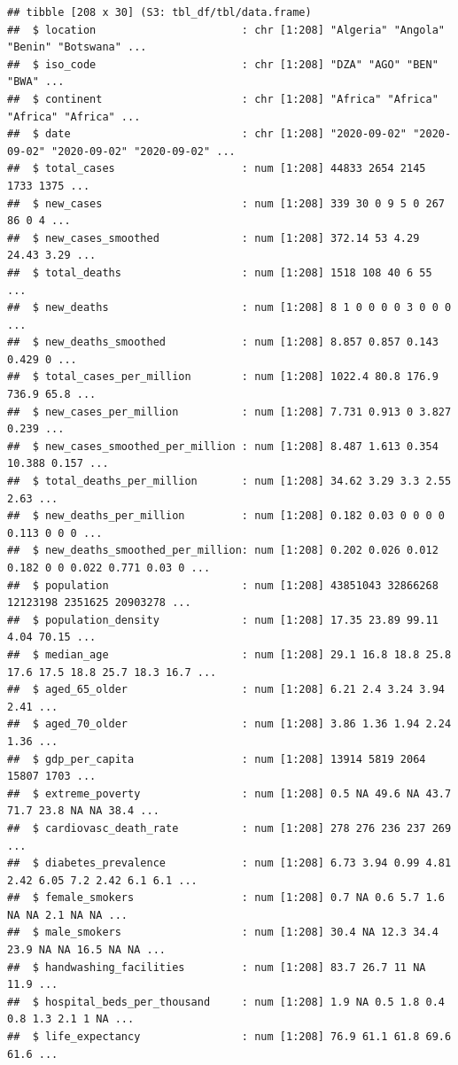 \documentclass[
]{article}
\begin{document}
\begin{verbatim}
## tibble [208 x 30] (S3: tbl_df/tbl/data.frame)
##  $ location                       : chr [1:208] "Algeria" "Angola" "Benin" "Botswana" ...
##  $ iso_code                       : chr [1:208] "DZA" "AGO" "BEN" "BWA" ...
##  $ continent                      : chr [1:208] "Africa" "Africa" "Africa" "Africa" ...
##  $ date                           : chr [1:208] "2020-09-02" "2020-09-02" "2020-09-02" "2020-09-02" ...
##  $ total_cases                    : num [1:208] 44833 2654 2145 1733 1375 ...
##  $ new_cases                      : num [1:208] 339 30 0 9 5 0 267 86 0 4 ...
##  $ new_cases_smoothed             : num [1:208] 372.14 53 4.29 24.43 3.29 ...
##  $ total_deaths                   : num [1:208] 1518 108 40 6 55 ...
##  $ new_deaths                     : num [1:208] 8 1 0 0 0 0 3 0 0 0 ...
##  $ new_deaths_smoothed            : num [1:208] 8.857 0.857 0.143 0.429 0 ...
##  $ total_cases_per_million        : num [1:208] 1022.4 80.8 176.9 736.9 65.8 ...
##  $ new_cases_per_million          : num [1:208] 7.731 0.913 0 3.827 0.239 ...
##  $ new_cases_smoothed_per_million : num [1:208] 8.487 1.613 0.354 10.388 0.157 ...
##  $ total_deaths_per_million       : num [1:208] 34.62 3.29 3.3 2.55 2.63 ...
##  $ new_deaths_per_million         : num [1:208] 0.182 0.03 0 0 0 0 0.113 0 0 0 ...
##  $ new_deaths_smoothed_per_million: num [1:208] 0.202 0.026 0.012 0.182 0 0 0.022 0.771 0.03 0 ...
##  $ population                     : num [1:208] 43851043 32866268 12123198 2351625 20903278 ...
##  $ population_density             : num [1:208] 17.35 23.89 99.11 4.04 70.15 ...
##  $ median_age                     : num [1:208] 29.1 16.8 18.8 25.8 17.6 17.5 18.8 25.7 18.3 16.7 ...
##  $ aged_65_older                  : num [1:208] 6.21 2.4 3.24 3.94 2.41 ...
##  $ aged_70_older                  : num [1:208] 3.86 1.36 1.94 2.24 1.36 ...
##  $ gdp_per_capita                 : num [1:208] 13914 5819 2064 15807 1703 ...
##  $ extreme_poverty                : num [1:208] 0.5 NA 49.6 NA 43.7 71.7 23.8 NA NA 38.4 ...
##  $ cardiovasc_death_rate          : num [1:208] 278 276 236 237 269 ...
##  $ diabetes_prevalence            : num [1:208] 6.73 3.94 0.99 4.81 2.42 6.05 7.2 2.42 6.1 6.1 ...
##  $ female_smokers                 : num [1:208] 0.7 NA 0.6 5.7 1.6 NA NA 2.1 NA NA ...
##  $ male_smokers                   : num [1:208] 30.4 NA 12.3 34.4 23.9 NA NA 16.5 NA NA ...
##  $ handwashing_facilities         : num [1:208] 83.7 26.7 11 NA 11.9 ...
##  $ hospital_beds_per_thousand     : num [1:208] 1.9 NA 0.5 1.8 0.4 0.8 1.3 2.1 1 NA ...
##  $ life_expectancy                : num [1:208] 76.9 61.1 61.8 69.6 61.6 ...
\end{verbatim}
\end{document}
